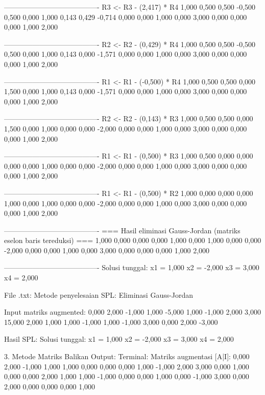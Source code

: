 \documentclass[12pt]{article}
\begin{document}
\begin{enumerate}
\begin{keluaran}
----------------------------------------
R3 <- R3 - (2,417) * R4
1,000   0,500   0,500   -0,500  0,500
0,000   1,000   0,143   0,429   -0,714
0,000   0,000   1,000   0,000   3,000
0,000   0,000   0,000   1,000   2,000

----------------------------------------
R2 <- R2 - (0,429) * R4
1,000   0,500   0,500   -0,500  0,500
0,000   1,000   0,143   0,000   -1,571
0,000   0,000   1,000   0,000   3,000
0,000   0,000   0,000   1,000   2,000

----------------------------------------
R1 <- R1 - (-0,500) * R4
1,000   0,500   0,500   0,000   1,500
0,000   1,000   0,143   0,000   -1,571
0,000   0,000   1,000   0,000   3,000
0,000   0,000   0,000   1,000   2,000

----------------------------------------
R2 <- R2 - (0,143) * R3
1,000   0,500   0,500   0,000   1,500
0,000   1,000   0,000   0,000   -2,000
0,000   0,000   1,000   0,000   3,000
0,000   0,000   0,000   1,000   2,000

----------------------------------------
R1 <- R1 - (0,500) * R3
1,000   0,500   0,000   0,000   0,000
0,000   1,000   0,000   0,000   -2,000
0,000   0,000   1,000   0,000   3,000
0,000   0,000   0,000   1,000   2,000

----------------------------------------
R1 <- R1 - (0,500) * R2
1,000   0,000   0,000   0,000   1,000
0,000   1,000   0,000   0,000   -2,000
0,000   0,000   1,000   0,000   3,000
0,000   0,000   0,000   1,000   2,000

----------------------------------------
=== Hasil eliminasi Gauss-Jordan (matriks eselon baris tereduksi) ===
1,000   0,000   0,000   0,000   1,000
0,000   1,000   0,000   0,000   -2,000
0,000   0,000   1,000   0,000   3,000
0,000   0,000   0,000   1,000   2,000

----------------------------------------
Solusi tunggal:
x1 = 1,000
x2 = -2,000
x3 = 3,000
x4 = 2,000

File .txt:
Metode penyelesaian SPL: Eliminasi Gauss-Jordan

Input matriks augmented:
0,000	2,000	-1,000	1,000	-5,000
1,000	-1,000	2,000	3,000	15,000
2,000	1,000	1,000	-1,000	1,000
-1,000	3,000	0,000	2,000	-3,000

Hasil SPL:
Solusi tunggal:
x1 = 1,000
x2 = -2,000
x3 = 3,000
x4 = 2,000

3. Metode Matriks Balikan
Output:
Terminal:
Matriks augmentasi [A|I]:
0,000   2,000   -1,000  1,000   1,000   0,000   0,000   0,000
1,000   -1,000  2,000   3,000   0,000   1,000   0,000   0,000
2,000   1,000   1,000   -1,000  0,000   0,000   1,000   0,000
-1,000  3,000   0,000   2,000   0,000   0,000   0,000   1,000


\end{keluaran}
\end{enumerate}
\end{document}
